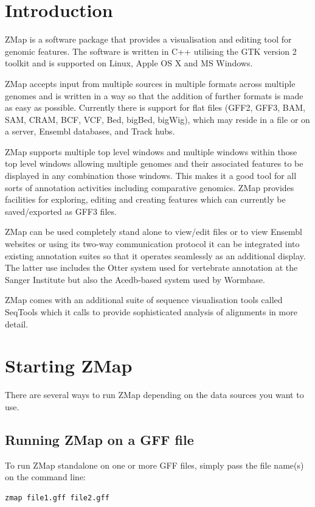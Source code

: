 \documentclass[letterpaper]{article}
\begin{document}
\bigskip

\setcounter{tocdepth}{10}
\renewcommand\contentsname{Contents}

\clearpage\tableofcontents

\clearpage
\section{Introduction}

ZMap is a software package that provides a visualisation and editing tool for genomic features. The software is written in C++ utilising the GTK version 2 toolkit and is supported on Linux, Apple OS X and MS Windows.

ZMap accepts input from multiple sources in multiple formats across multiple genomes and is written in a way so that the addition of further formats is made as easy as possible. Currently there is support for flat files (GFF2, GFF3, BAM, SAM, CRAM, BCF, VCF, Bed, bigBed, bigWig), which may reside in a file or on a server, Ensembl databases, and Track hubs.

ZMap supports multiple top level windows and multiple windows within those top level windows allowing multiple genomes and their associated features to be displayed in any combination those windows. This makes it a good tool for all sorts of annotation activities including comparative genomics. ZMap provides facilities for exploring, editing and creating features which can currently be saved/exported as GFF3 files.

ZMap can be used completely stand alone to view/edit files or to view Ensembl websites or using its two-way communication protocol it can be integrated into existing annotation suites so that it operates seamlessly as an additional display. The latter use includes the Otter system used for vertebrate annotation at the Sanger Institute but also the Acedb-based system used by Wormbase.

ZMap comes with an additional suite of sequence visualisation tools called SeqTools which it calls to provide sophisticated analysis of alignments in more detail.

\clearpage
\section{Starting ZMap}
There are several ways to run ZMap depending on the data sources you want to use.

\subsection{Running ZMap on a GFF file}
To run ZMap standalone on one or more GFF files, simply pass the file name(s) on the command line:
\begin{lstlisting}
zmap file1.gff file2.gff
\end{lstlisting}
\end{document}
